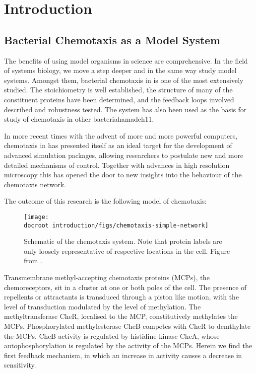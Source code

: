\documentclass[../main.tex]{subfiles}
\begin{document}
\section{Introduction}

\subsection{Bacterial Chemotaxis as a Model System}
The benefits of using model organisms in science are comprehensive. In the field of systems biology, we move a step deeper and in the same way study model systems. Amongst them, bacterial chemotaxis in \ecolilong is one of the most extensively studied. The stoichiometry is well established\citep{li04}, the structure of many of the constituent proteins have been determined\citep{zhou02, milligan87, stock89}, and the feedback loops involved described\citep{kentner09} and robustness tested\citep{yi00}. The \ecoli system has also been used as the basis for study of chemotaxis in other bacteria{hamadeh11}.

In more recent times with the advent of more and more powerful computers, chemotaxis in \ecoli has presented itself as an ideal target for the development of advanced simulation packages, allowing researchers to postulate new and more detailed mechanisms of control\citep{lipkow05, lipkow06}. Together with advances in high resolution microscopy\citep{greenfield09} this has opened the door to new insights into the behaviour of the \ecoli chemotaxis network.

The outcome of this research is the following model of chemotaxis:

\begin{figure}[h!]
\begin{center}
\texttt{[image: \\docroot introduction/figs/chemotaxis-simple-network]}
\caption[Schematic of the chemotaxis system]{Schematic of the chemotaxis system. Note that protein labels are only loosely representative of respective locations in the cell. Figure from \citet{lipkowfigs}.}
\end{center}
\end{figure}

Transmembrane methyl-accepting chemotaxis proteins (MCPs), the chemoreceptors, sit in a cluster at one or both poles of the cell. The presence of repellents or attractants is transduced through a piston like motion\citep{hall11}, with the level of transduction modulated by the level of methylation. The methyltransferase CheR, localised to the MCP, constitutively methylates the MCPs. Phosphorylated methylesterase CheB competes with CheR to demthylate the MCPs. CheB activity is regulated by histidine kinase CheA, whose autophosphorylation is regulated by the activity of the  MCPs. Herein we find the first feedback mechanism, in which an increase in activity causes a decrease in sensitivity.
\end{document}
